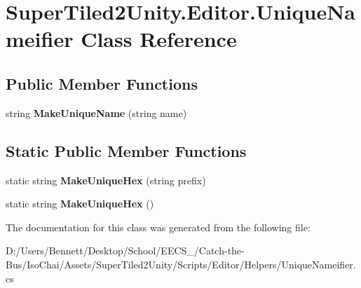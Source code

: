 \hypertarget{class_super_tiled2_unity_1_1_editor_1_1_unique_nameifier}{}\section{Super\+Tiled2\+Unity.\+Editor.\+Unique\+Nameifier Class Reference}
\label{class_super_tiled2_unity_1_1_editor_1_1_unique_nameifier}
\subsection*{Public Member Functions}
\begin{DoxyCompactItemize}
\item 
\mbox{\label{class_super_tiled2_unity_1_1_editor_1_1_unique_nameifier_a7a8d9eb5c8cb8db0de6e2e367a67ca45}} 
string {\bfseries Make\+Unique\+Name} (string name)
\end{DoxyCompactItemize}
\subsection*{Static Public Member Functions}
\begin{DoxyCompactItemize}
\item 
\mbox{\label{class_super_tiled2_unity_1_1_editor_1_1_unique_nameifier_ade1b815abac2252cc2ba0901563681a4}} 
static string {\bfseries Make\+Unique\+Hex} (string prefix)
\item 
\mbox{\label{class_super_tiled2_unity_1_1_editor_1_1_unique_nameifier_a90510031acd21a8afd4236a2298cbcbf}} 
static string {\bfseries Make\+Unique\+Hex} ()
\end{DoxyCompactItemize}


The documentation for this class was generated from the following file\+:\begin{DoxyCompactItemize}
\item 
D\+:/\+Users/\+Bennett/\+Desktop/\+School/\+E\+E\+C\+S\+\_/\+Catch-\/the-\/\+Bus/\+Iso\+Chai/\+Assets/\+Super\+Tiled2\+Unity/\+Scripts/\+Editor/\+Helpers/Unique\+Nameifier.\+cs\end{DoxyCompactItemize}
